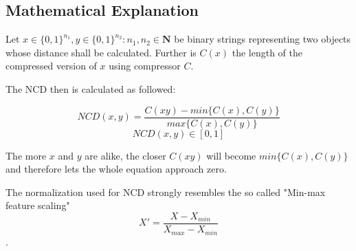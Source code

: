 \subsection{Mathematical Explanation}

Let $x \in \{0,1\}^{n_{1}}, y \in \{0,1\}^{n_{2}} : n_{1}, n_{2} \in \mathbf{N}$ be binary strings representing two objects whose distance shall be calculated. Further is $C(x)$ the length of the compressed version of $x$ using compressor $C$.

The NCD then is calculated as followed:

$$ NCD(x,y) = \frac{C(xy) - min\{ C(x), C(y) \}}{max\{C(x), C(y) \}} $$
$$ NCD(x,y) \in [0,1] $$

The more $x$ and $y$ are alike, the closer $C(xy)$ will become $min\{C(x), C(y)\}$ and therefore lets the whole equation approach zero.


The normalization used for NCD strongly resembles the so called "Min-max feature scaling" $$X' = \frac{X - X_{min}}{X_{max} - X_{min}}$$.